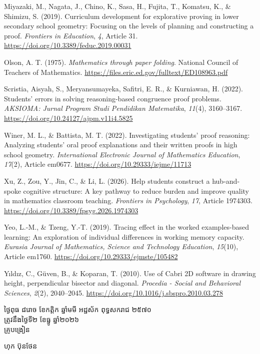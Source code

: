 \documentclass[a4paper,12pt]{article}
\begin{document}
{Miyazaki, M., Nagata, J., Chino, K., Sasa, H., Fujita, T., Komatsu, K., \& Shimizu, S. (2019). Curriculum development for explorative proving in lower secondary school geometry: Focusing on the levels of planning and constructing a proof. \textit{Frontiers in Education}, \textit{4}, Article 31. \url{https://doi.org/10.3389/feduc.2019.00031}

Olson, A. T. (1975). \textit{Mathematics through paper folding}. National Council of Teachers of Mathematics. \url{https://files.eric.ed.gov/fulltext/ED108963.pdf}

Scristia, Aisyah, S., Meryansumayeka, Safitri, E. R., \& Kurniawan, H. (2022). Students' errors in solving reasoning-based congruence proof problems. \textit{AKSIOMA: Jurnal Program Studi Pendidikan Matematika}, \textit{11}(4), 3160--3167. \url{https://doi.org/10.24127/ajpm.v11i4.5825}

Winer, M. L., \& Battista, M. T. (2022). Investigating students' proof reasoning: Analyzing students' oral proof explanations and their written proofs in high school geometry. \textit{International Electronic Journal of Mathematics Education}, \textit{17}(2), Article em0677. \url{https://doi.org/10.29333/iejme/11713}

Xu, Z., Zou, Y., Jin, C., \& Li, L. (2026). Help students construct a hub-and-spoke cognitive structure: A key pathway to reduce burden and improve quality in mathematics classroom teaching. \textit{Frontiers in Psychology}, \textit{17}, Article 1974303. \url{https://doi.org/10.3389/fpsyg.2026.1974303}

Yeo, L.-M., \& Tzeng, Y.-T. (2019). Tracing effect in the worked examples-based learning: An exploration of individual differences in working memory capacity. \textit{Eurasia Journal of Mathematics, Science and Technology Education}, \textit{15}(10), Article em1760. \url{https://doi.org/10.29333/ejmste/105482}

Yıldız, C., Güven, B., \& Koparan, T. (2010). Use of Cabri 2D software in drawing height, perpendicular bisector and diagonal. \textit{Procedia - Social and Behavioral Sciences}, \textit{2}(2), 2040--2045. \url{https://doi.org/10.1016/j.sbspro.2010.03.278}
\par}

\vspace{24pt}
\Needspace{2.0cm}
\hfill
\begin{minipage}{9.8cm}
  {\centering
    ថ្ងៃពុធ ៨រោច ខែកត្តិក ឆ្នាំមមី អដ្ឋស័ក ពុទ្ធសករាជ ២៥៧០\\[2pt]
    ត្រូវនឹងថ្ងៃទី២ ខែធ្នូ ឆ្នាំ២០២៦\\[3pt]
    {\muol គ្រូបង្រៀន}\par}
  \vspace{32pt}
  \hfill{\muol ហុក ប៊ុនថែន}\hspace*{1.4cm}
\end{minipage}
\end{document}
